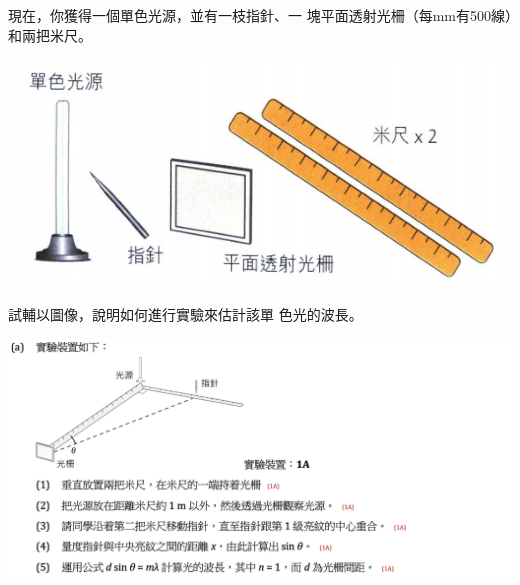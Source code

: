 {
    現在，你獲得一個單色光源，並有一枝指針、一 塊平面透射光柵（每mm有500線）和兩把米尺。
    \par{\par\centering\includegraphics[width=.45\textwidth]{./img/ch4_earlyclass_wave_lq_2024-05-14-14-17-02.png}\par}
    試輔以圖像，說明如何進行實驗來估計該單 色光的波長。
}{
    \sol \par{\par\centering\includegraphics[width=\textwidth]{./img/ch4_earlyclass_wave_lq_2024-05-14-14-18-08.png}\par}
}

